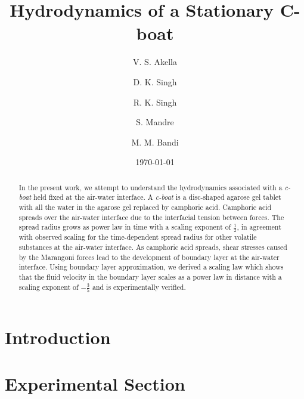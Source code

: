 \documentclass[aps, twocolumn, floatfix, superscriptaddress]{revtex4}
\begin{document}
\title{Hydrodynamics of a Stationary C-boat}

\author{V. S. Akella}
\author{D. K. Singh}
\author{R. K. Singh}
\author{S. Mandre}
\author{M. M. Bandi}

\date{\today}

\begin{abstract}
In the present work, we attempt to understand the hydrodynamics associated with a \emph{c-boat} held fixed at the air-water interface. A \emph{c-boat} is a disc-shaped agarose gel tablet with all the water in the agarose gel replaced by camphoric acid. Camphoric acid spreads over the air-water interface due to the interfacial tension between forces. The spread radius grows as power law in time with a scaling exponent of $\frac{1}{2}$, in agreement with observed scaling for the time-dependent spread radius for other volatile substances at the air-water interface. As camphoric acid spreads, shear stresses caused by the Marangoni forces lead to the development of boundary layer at the air-water interface. Using boundary layer approximation, we derived a scaling law which shows that the fluid velocity in the boundary layer scales as a power law in distance with a scaling exponent of $-\frac{3}{5}$ and is experimentally verified. 
\end{abstract}

\maketitle
\section{Introduction}
\section{Experimental Section}
\end{document}
